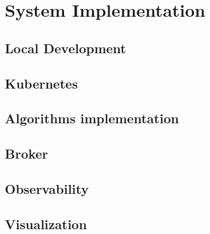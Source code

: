 \chapter{System Implementation}

\section{Local Development}


\section{Kubernetes}


\section{Algorithms implementation}


\section{Broker}


\section{Observability}
\label{sec:04_06_observability}


% 

\section{Visualization}

